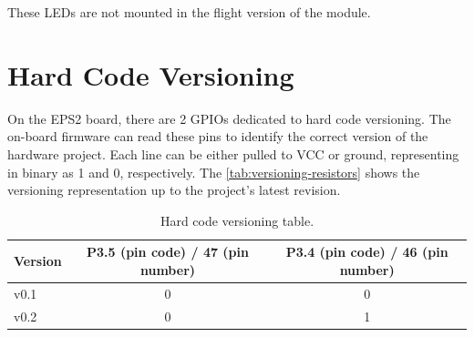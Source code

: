 These LEDs are not mounted in the flight version of the module.

\section{Hard Code Versioning}

On the EPS2 board, there are 2 GPIOs dedicated to hard code versioning.
The on-board firmware can read these pins to identify the correct version of the hardware project.
Each line can be either pulled to VCC or ground, representing in binary as 1 and 0, respectively.
The \autoref{tab:versioning-resistors} shows the versioning representation up to the project's latest revision.

\begin{table}[!h]
    \centering
    \begin{tabular}{lcc}
        \toprule[1.5pt]
        \textbf{Version}    &   \textbf{P3.5 (pin code) / 47 (pin number)}    &    \textbf{P3.4 (pin code) / 46 (pin number)}\\
        \midrule
        v0.1                & 0                 & 0              \\
        v0.2                & 0                 & 1              \\
        \bottomrule[1.5pt]
    \end{tabular}
    \caption{Hard code versioning table.}
    \label{tab:versioning-resistors}
\end{table}
